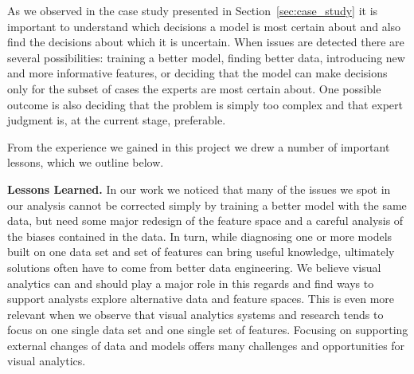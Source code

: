 As we observed in the case study presented in Section~\ref{sec:case_study} it is important to understand which decisions a model is most certain about and also find the decisions about which it is uncertain. When issues are detected there are several possibilities: training a better model, finding better data, introducing new and more informative features, or deciding that the model can make decisions only for the subset of cases the experts are most certain about. One possible outcome is also deciding that the problem is simply too complex and that expert judgment is, at the current stage, preferable.

From the experience we gained in this project we drew a number of important lessons, which we outline below.

\par \noindent \textbf{Lessons Learned.}
In our work we noticed that many of the issues we spot in our analysis cannot be corrected simply by training a better model with the same data, but need some major redesign of the feature space and a careful analysis of the biases contained in the data. In turn, while diagnosing one or more models built on one data set and set of features can bring useful knowledge, ultimately solutions often have to come from better data engineering. We believe visual analytics can and should play a major role in this regards and find ways to support analysts explore alternative data and feature spaces. This is even more relevant when we observe that visual analytics systems and research tends to focus on one single data set and one single set of features.
Focusing on supporting external changes of data and models offers many challenges and opportunities for visual analytics.




